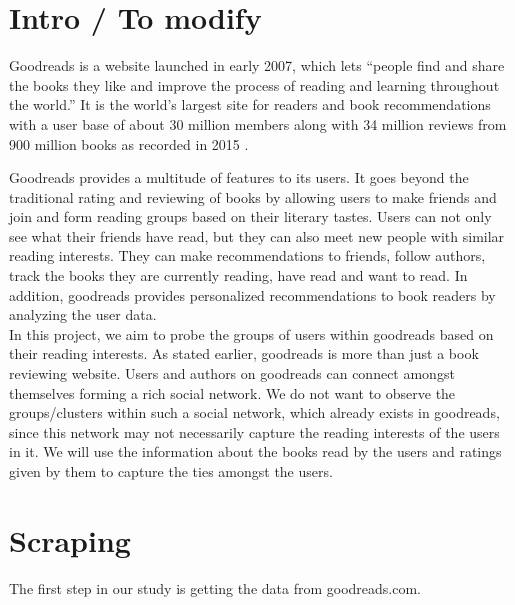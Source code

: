 \documentclass[11pt]{article}
\begin{document}
\maketitle

\newpage

\section{Intro / To modify}


Goodreads is a website launched in early 2007, which lets ``people find and share the books they like and improve the process of reading and learning throughout the world.'' It is the world's largest site for readers and book recommendations with a user base of about 30 million members along with 34 million reviews from 900 million books as recorded in 2015 \cite{goodreads:aboutus}.

Goodreads provides a multitude of features to its users. It goes beyond the traditional rating and reviewing of books by allowing users to make friends and join and form reading groups based on their literary tastes.
Users can not only see what their friends have read, but they can also meet new people with similar reading interests. They can make recommendations to friends, follow authors, track the books they are currently reading, have read and want to read. In addition, goodreads provides personalized recommendations to book readers by analyzing the user data. \\


In this project, we aim to probe the groups of users within goodreads based on their reading interests. As stated earlier, goodreads is more than just a book reviewing website. Users and authors on goodreads can connect amongst themselves forming a rich social network. We do not want to observe the groups/clusters within such a social network, which already exists in goodreads, since this network may not necessarily capture the reading interests of the users in it. We will use the information about the books read by the users and ratings given by them to capture the ties amongst the users.\\

\section{Scraping}

The first step in our study is getting the data from goodreads.com.



\end{document}
